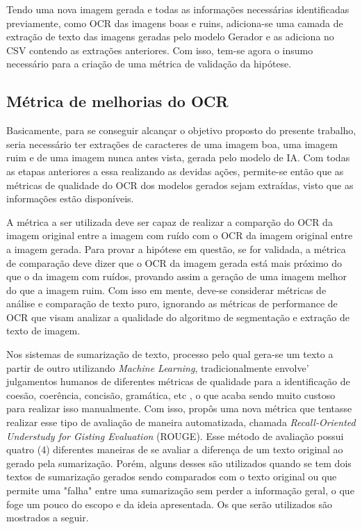 Tendo uma nova imagem gerada e todas as informações necessárias identificadas previamente, como OCR das imagens boas e ruins, adiciona-se uma camada de extração de texto das imagens geradas pelo modelo Gerador e as adiciona no CSV contendo as extrações anteriores. Com isso, tem-se agora o insumo necessário para a criação de uma métrica de validação da hipótese.

\subsection{Métrica de melhorias do OCR}

Basicamente, para se conseguir alcançar o objetivo proposto do presente trabalho, seria necessário ter extrações de caracteres de uma imagem boa, uma imagem ruim e de uma imagem nunca antes vista, gerada pelo modelo de IA. Com todas as etapas anteriores a essa realizando as devidas ações, permite-se então que as métricas de qualidade do OCR dos modelos gerados sejam extraídas, visto que as informações estão disponíveis.

A métrica a ser utilizada deve ser capaz de realizar a comparção do OCR da imagem original entre a imagem com ruído com o OCR da imagem original entre a imagem gerada. Para provar a hipótese em questão, se for validada, a métrica de comparação deve dizer que o OCR da imagem gerada está mais próximo do que o da imagem com ruídos, provando assim a geração de uma imagem melhor do que a imagem ruim. Com isso em mente, deve-se considerar métricas de análise e comparação de texto puro, ignorando as métricas de performance de OCR que visam analizar a qualidade do algoritmo de segmentação e extração de texto de imagem.

Nos sistemas de sumarização de texto, processo pelo qual gera-se um texto a partir de outro utilizando \textit{Machine Learning}, tradicionalmente envolve' julgamentos humanos de diferentes métricas de qualidade para a identificação de coesão, coerência, concisão, gramática, etc \cite{automatic-summarization}, o que acaba sendo muito custoso para realizar isso manualmente. Com isso,  propôs uma nova métrica que tentasse realizar esse tipo de avaliação de maneira automatizada, chamada \textit{Recall-Oriented Understudy for Gisting Evaluation} (ROUGE). Esse método de avaliação possui quatro (4) diferentes maneiras de se avaliar a diferença de um texto original ao gerado pela sumarização. Porém, alguns desses são utilizados quando se tem dois textos de sumarização gerados sendo comparados com o texto original ou que permite uma "falha" entre uma sumarização sem perder a informação geral, o que foge um pouco do escopo e da ideia apresentada. Os que serão utilizados são mostrados a seguir.

